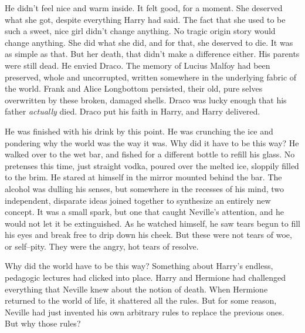 
He didn’t feel nice and warm inside. It felt good, for a moment. She deserved what she got, despite everything Harry had said. The fact that she used to be such a sweet, nice girl didn’t change anything. No tragic origin story would change anything. She did what she did, and for that, she deserved to die. It was as simple as that. But her death, that didn’t make a difference either.
\SmallVSpace
His parents were still dead.
\SmallVSpace
He envied Draco. The memory of Lucius Malfoy had been preserved, whole and uncorrupted, written somewhere in the underlying fabric of the world. Frank and Alice Longbottom persisted, their old, pure selves overwritten by these broken, damaged shells. Draco was lucky enough that his father \emph{actually} died. Draco put his faith in Harry, and Harry delivered.


He was finished with his drink by this point. He was crunching the ice and pondering why the world was the way it was. Why did it have to be this way? He walked over to the wet bar, and fished for a different bottle to refill his glass. No pretenses this time, just straight vodka, poured over the melted ice, sloppily filled to the brim. He stared at himself in the mirror mounted behind the bar.
\SmallVSpace
The alcohol was dulling his senses, but somewhere in the recesses of his mind, two independent, disparate ideas joined together to synthesize an entirely new concept. It was a small spark, but one that caught Neville’s attention, and he would not let it be extinguished. As he watched himself, he saw tears begun to fill his eyes and break free to drip down his cheek. But these were not tears of woe, or self\mbox{--}pity. They were the angry, hot tears of resolve.

Why did the world have to be this way?
\SmallVSpace
Something about Harry’s endless, pedagogic lectures had clicked into place. Harry and Hermione had challenged everything that Neville knew about the notion of death. When Hermione returned to the world of life, it shattered all the rules. But for some reason, Neville had just invented his own arbitrary rules to replace the previous ones. But why those rules?

